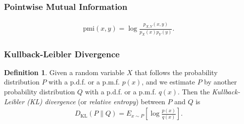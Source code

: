 \documentclass[a4paper,12pt]{article}
\theoremstyle{definition}
\newtheorem*{definition}{Definition}
\begin{document}
\subsubsection*{Pointwise Mutual Information}
\begin{align*}
    \mathrm{pmi}(x, y) = \log\frac{p_{X, Y}(x, y)}{p_X(x) p_Y(y)}.
\end{align*}
\subsubsection*{Kullback-Leibler Divergence}
\begin{definition}
    Given a random variable $X$ that follows the probability distribution $P$ with a p.d.f. or a p.m.f. $p(x)$, 
    and we estimate $P$ by another probability distribution $Q$ with a p.d.f. or a p.m.f. $q(x)$. Then the 
    \emph{Kullback-Leibler (KL) divergence} (or \emph{relative entropy}) between $P$ and $Q$ is 
    \begin{align*}
        D_{\mathrm{KL}}(P\|Q) = E_{x \sim P} \left[ \log \frac{p(x)}{q(x)} \right].
    \end{align*}
\end{definition}
\end{document}
